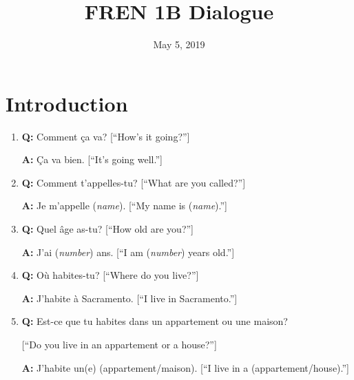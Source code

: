 \documentclass{article}
\theoremstyle{definition}
\theoremstyle{remark}
\theoremstyle{definition}
\begin{document}
\title{FREN 1B Dialogue}
\date{May 5, 2019}
\maketitle

\section{Introduction}
\hline

\vspace{4mm}

\begin{enumerate}[leftmargin=*]
    \item\textbf{Q:} Comment \c ca va? [``How's it going?'']\par 
        \noindent\textbf{A:} \c Ca va bien. [``It's going well.'']\par \vspace{3mm}
        \hline
        
    \item\textbf{Q:} Comment t'appelles-tu? [``What are you called?'']\par 
        \noindent\textbf{A:} Je m'appelle (\textit{name}). [``My name is (\textit{name}).'']\par \vspace{3mm}
        \hline
    
    \item\textbf{Q:} Quel \^age as-tu? [``How old are you?'']\par
        \noindent\textbf{A:} J'ai (\textit{number}) ans. [``I am (\textit{number}) years old.'']\par \vspace{3mm}
        \hline
    
    \item\textbf{Q:} O\`u habites-tu? [``Where do you live?'']\par 
        \noindent\textbf{A:} J'habite \`a Sacramento. [``I live in Sacramento.'']\par \vspace{3mm}
        \hline 
        
    \item\textbf{Q:} Est-ce que tu habites dans un appartement ou une maison?\par\hspace{5.5mm}[``Do you live in an appartement or a house?'']\par 
        \noindent\textbf{A:} J'habite un(e) (appartement/maison). [``I live in a (appartement/house).'']\par \vspace{3mm}
        
        
\end{enumerate}
\end{document}
